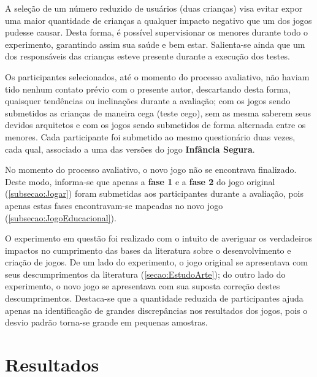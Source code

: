 \documentclass[alpha-refs,brazilian]{RBCA_v2.0}
\begin{document}
\newpage

A seleção de um número reduzido de usuários (duas crianças) visa evitar expor uma maior quantidade de crianças a qualquer impacto negativo que um dos jogos pudesse causar. Desta forma, é possível supervisionar os menores durante todo o experimento, garantindo assim sua saúde e bem estar. Salienta-se ainda que um dos responsáveis das crianças esteve presente durante a execução dos testes.%

Os participantes selecionados, até o momento do processo avaliativo, não haviam tido nenhum contato prévio com o presente autor, descartando desta forma, quaisquer tendências ou inclinações durante a avaliação; com os jogos sendo submetidos as crianças de maneira cega (teste cego), sem as mesma saberem seus devidos arquitetos e com os jogos sendo submetidos de forma alternada entre os menores. Cada participante foi submetido ao mesmo questionário duas vezes, cada qual, associado a uma das versões do jogo \textbf{Infância Segura}.

No momento do processo avaliativo, o novo jogo não se encontrava finalizado. Deste modo, informa-se que apenas a \textbf{fase 1} e a \textbf{fase 2} do jogo original (\cref{subsecao:Jogar}) foram submetidas aos participantes durante a avaliação, pois apenas estas fases encontravam-se mapeadas no novo jogo (\cref{subsecao:JogoEducacional}).

O experimento em questão foi realizado com o intuito de averiguar os verdadeiros impactos no cumprimento das bases da literatura sobre o desenvolvimento e criação de jogos. De um lado do experimento, o jogo original se apresentava com seus descumprimentos da literatura (\cref{secao:EstudoArte}); do outro lado do experimento, o novo jogo se apresentava com sua suposta correção destes descumprimentos. Destaca-se que a quantidade reduzida de participantes ajuda apenas na identificação de grandes discrepâncias nos resultados dos jogos, pois o desvio padrão torna-se grande em pequenas amostras.



\section{Resultados}\label{secao:Resultados}
\end{document}
